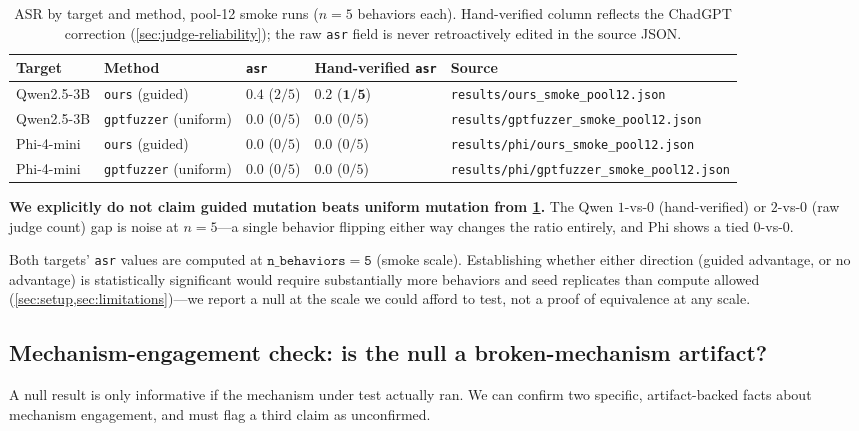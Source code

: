 \documentclass[11pt,letterpaper]{article}
\begin{document}
\begin{table}[htbp]
\centering
\caption{ASR by target and method, pool-12 smoke runs ($n=5$ behaviors each). Hand-verified
  column reflects the ChadGPT correction (\cref{sec:judge-reliability}); the raw \texttt{asr}
  field is never retroactively edited in the source JSON.}
\label{tab:null}
\begin{tabular}{p{2.0cm}p{2.6cm}p{1.6cm}p{2.0cm}p{4.3cm}}
\toprule
Target & Method & \texttt{asr} & Hand-verified \texttt{asr} & Source \\
\midrule
Qwen2.5-3B & \texttt{ours} (guided) & $0.4$ ($2/5$) & $\mathbf{0.2}$ ($\mathbf{1/5}$) & \texttt{results/ours\_smoke\_pool12.json} \\
Qwen2.5-3B & \texttt{gptfuzzer} (uniform) & $0.0$ ($0/5$) & $0.0$ ($0/5$) & \texttt{results/gptfuzzer\_smoke\_pool12.json} \\
Phi-4-mini & \texttt{ours} (guided) & $0.0$ ($0/5$) & $0.0$ ($0/5$) & \texttt{results/phi/ours\_smoke\_pool12.json} \\
Phi-4-mini & \texttt{gptfuzzer} (uniform) & $0.0$ ($0/5$) & $0.0$ ($0/5$) & \texttt{results/phi/gptfuzzer\_smoke\_pool12.json} \\
\bottomrule
\end{tabular}
\end{table}

\textbf{We explicitly do not claim guided mutation beats uniform mutation from
\cref{tab:null}.} The Qwen $1$-vs-$0$ (hand-verified) or $2$-vs-$0$ (raw judge count) gap is
noise at $n=5$---a single behavior flipping either way changes the ratio entirely, and Phi shows
a tied $0$-vs-$0$.

Both targets' \texttt{asr} values are computed at $\mathtt{n\_behaviors=5}$ (smoke scale).
Establishing whether either direction (guided advantage, or no advantage) is statistically
significant would require substantially more behaviors and seed replicates than compute allowed
(\cref{sec:setup,sec:limitations})---we report a null at the scale we could afford to test, not a
proof of equivalence at any scale.

\subsection{Mechanism-engagement check: is the null a broken-mechanism artifact?}
\label{sec:mechanism}

A null result is only informative if the mechanism under test actually ran. We can confirm two
specific, artifact-backed facts about mechanism engagement, and must flag a third claim as
unconfirmed.
\end{document}
